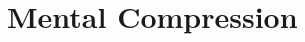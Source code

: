 \documentclass[11pt,a4paper]{book}
\begin{document}
















\section{Mental Compression}
\end{document}
